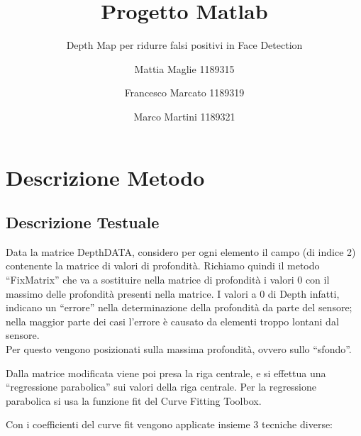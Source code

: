 \documentclass[
  italian,
]{article}
\title{Progetto Matlab}
\subtitle{Depth Map per ridurre falsi positivi in Face Detection}
\author{Mattia Maglie 1189315 \and Francesco Marcato 1189319 \and Marco
Martini 1189321}
\date{}
\begin{document}
\maketitle

\hypertarget{descrizione-metodo}{%
\section{Descrizione Metodo}\label{descrizione-metodo}}

\hypertarget{descrizione-testuale}{%
\subsection{Descrizione Testuale}\label{descrizione-testuale}}

Data la matrice DepthDATA, considero per ogni elemento il campo (di
indice 2) contenente la matrice di valori di profondità. Richiamo quindi
il metodo ``FixMatrix'' che va a sostituire nella matrice di profondità
i valori 0 con il massimo delle profondità presenti nella matrice. I
valori a 0 di Depth infatti, indicano un ``errore'' nella determinazione
della profondità da parte del sensore; nella maggior parte dei casi
l'errore è causato da elementi troppo lontani dal sensore.\\
Per questo vengono posizionati sulla massima profondità, ovvero sullo
``sfondo''.

Dalla matrice modificata viene poi presa la riga centrale, e si effettua
una ``regressione parabolica'' sui valori della riga centrale. Per la
regressione parabolica si usa la funzione fit del Curve Fitting Toolbox.

Con i coefficienti del curve fit vengono applicate insieme 3 tecniche diverse:
\end{document}
